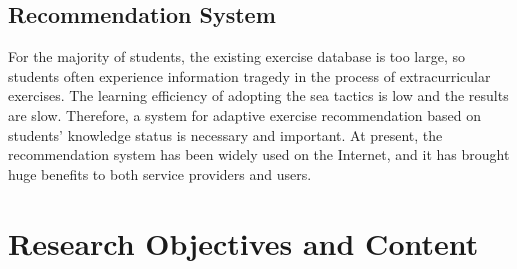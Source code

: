 \subsection{Recommendation System}

For the majority of students, the existing exercise database is too large, so students often experience information tragedy in the process of extracurricular exercises. The learning efficiency of adopting the sea tactics is low and the results are slow. Therefore, a system for adaptive exercise recommendation based on students' knowledge status is necessary and important. At present, the recommendation system has been widely used on the Internet, and it has brought huge benefits to both service providers and users.

\section{Research Objectives and Content}  %

